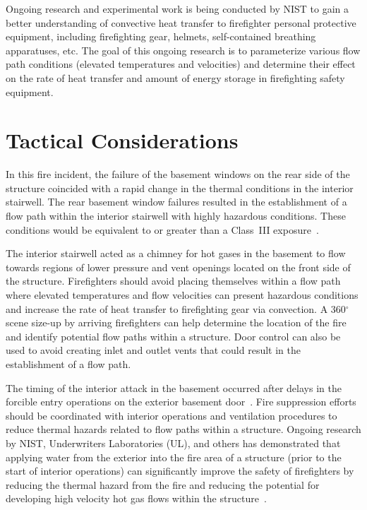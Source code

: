 \documentclass[12pt,oneside]{book}
\begin{document}
Ongoing research and experimental work is being conducted by NIST to gain a better understanding of convective heat transfer to firefighter personal protective equipment, including firefighting gear, helmets, self-contained breathing apparatuses, etc. The goal of this ongoing research is to parameterize various flow path conditions (elevated temperatures and velocities) and determine their effect on the rate of heat transfer and amount of energy storage in firefighting safety equipment.


\clearpage


\section{Tactical Considerations}
\label{sec:tactical_condsiderations}

In this fire incident, the failure of the basement windows on the rear side of the structure coincided with a rapid change in the thermal conditions in the interior stairwell. The rear basement window failures resulted in the establishment of a flow path within the interior stairwell with highly hazardous conditions. These conditions would be equivalent to or greater than a Class~III exposure~\cite{Donnelly2006}.

The interior stairwell acted as a chimney for hot gases in the basement to flow towards regions of lower pressure and vent openings located on the front side of the structure. Firefighters should avoid placing themselves within a flow path where elevated temperatures and flow velocities can present hazardous conditions and increase the rate of heat transfer to firefighting gear via convection. A 360$^\circ$ scene size-up by arriving firefighters can help determine the location of the fire and identify potential flow paths within a structure. Door control can also be used to avoid creating inlet and outlet vents that could result in the establishment of a flow path.

The timing of the interior attack in the basement occurred after delays in the forcible entry operations on the exterior basement door~\cite{NIOSH:Bowyer2}. Fire suppression efforts should be coordinated with interior operations and ventilation procedures to reduce thermal hazards related to flow paths within a structure. Ongoing research by NIST, Underwriters Laboratories (UL), and others has demonstrated that applying water from the exterior into the fire area of a structure (prior to the start of interior operations) can significantly improve the safety of firefighters by reducing the thermal hazard from the fire and reducing the potential for developing high velocity hot gas flows within the structure~\cite{madrzykowski2009fire, kerber2009fire}.
\end{document}

